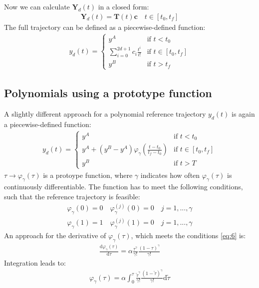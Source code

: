 \documentclass[a4paper,11pt,headings=standardclasses,parskip=half]{scrartcl}
\renewcommand{\d}{\mathrm{d}} %
\newcommand{\y}{\mathbf{y}}
\begin{document}
Now we can calculate $\mathbf{Y}_d(t)$ in a closed form:
\begin{align}
\label{eq:3}
\mathbf{Y}_d(t)=\mathbf{T}(t)\mathbf{c} \quad t \in [t_0,t_f] 
\end{align}
The full trajectory can be defined as a piecewise-defined function:
\begin{align}
y_d(t)=\begin{cases}y^A & \textrm{if } t<t_0 \\ \sum_{i=0}^{2d+1}c_i\frac{t^i}{i!} & \textrm{if } t\in [t_0,t_f] \\y^B & \textrm{if } t>t_f\end{cases}
\end{align}
\subsection{Polynomials using a prototype function}
A slightly different approach for a polynomial reference trajectory $y_d(t)$ is again a piecewise-defined function:
\begin{align}
\label{eq:5}
y_d(t) = \begin{cases} y^A &\textrm{if } t<t_0 \\ y^A + (y^B-y^A)\varphi_\gamma\left(\frac{t-t_0}{t_f-t_0}\right) &\textrm{if } t \in [t_0, t_f] \\y^B &\textrm{if } t>T\end{cases}
\end{align}
$\tau \rightarrow \varphi_\gamma(\tau)$ is a protoype function, where $\gamma$ indicates how often $\varphi_\gamma(\tau)$ is continuously differentiable. The function has to meet the following conditions, such that the reference trajectory is feasible:
\begin{subequations}
\label{eq:6}
\begin{align}
\varphi_\gamma(0)=0 \quad \varphi^{(j)}_\gamma(0)=0 \quad j = 1,...,\gamma \\
\varphi_\gamma(1)=1 \quad \varphi^{(j)}_\gamma(1)=0 \quad j = 1,...,\gamma 
\end{align}
\end{subequations}
An approach for the derivative of $\varphi_\gamma(\tau)$, which meets the conditions \eqref{eq:6} is:
\begin{align}
\frac{\d \varphi_\gamma(\tau)}{\d \tau} = \alpha \frac{\tau^{\gamma}}{\gamma!}\frac{(1-\tau)^{\gamma}}{\gamma!}
\end{align}
Integration leads to:
\begin{align}
\varphi_\gamma(\tau) = \alpha \int_0^\tau\frac{\tilde{\tau}^{\gamma}}{\gamma!}\frac{(1-\tilde{\tau})^{\gamma}}{\gamma!} \d \tilde{\tau}
\end{align}
\end{document}
